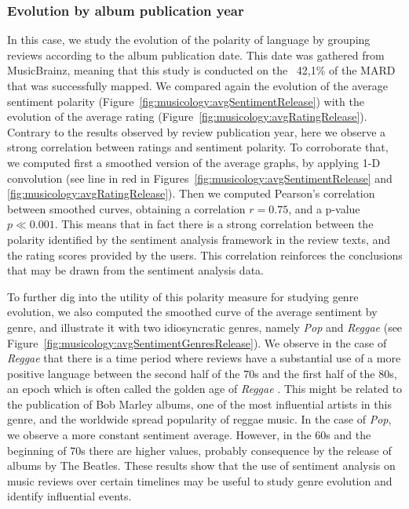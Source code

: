 \subsubsection{Evolution by album publication year}
\label{sec:musicology:evolution-album}

In this case, we study the evolution of the polarity of language by grouping reviews according to the album publication date. This date was gathered from MusicBrainz, meaning that this study is conducted on the ~42,1\% of the MARD that was successfully mapped. We compared again the evolution of the average sentiment polarity (Figure~\ref{fig:musicology:avgSentimentRelease}) with the evolution of the average rating (Figure~\ref{fig:musicology:avgRatingRelease}). Contrary to the results observed by review publication year, here we observe a strong correlation between ratings and sentiment polarity. To corroborate that, we computed first a smoothed version of the average graphs, by applying 1-D convolution (see line in red in Figures~\ref{fig:musicology:avgSentimentRelease} and \ref{fig:musicology:avgRatingRelease}). Then we computed Pearson's correlation between smoothed curves, obtaining a correlation $r = 0.75$, and a p-value $p \ll 0.001$. This means that in fact there is a strong correlation between the polarity identified by the sentiment analysis framework in the review texts, and the rating scores provided by the users. This correlation reinforces the conclusions that may be drawn from the sentiment analysis data. %

To further dig into the utility of this polarity measure for studying genre evolution, we also computed the smoothed curve of the average sentiment by genre, and illustrate it with two idiosyncratic genres, namely \textit{Pop} and \textit{Reggae} (see  Figure~\ref{fig:musicology:avgSentimentGenresRelease}). We observe in the case of \textit{Reggae} that there is a time period where reviews have a substantial use of a more positive language between the second half of the 70s and the first half of the 80s, an epoch which is often called the golden age of \textit{Reggae} \citep{alleyne2012encyclopedia}. This might be related to the publication of Bob Marley albums, one of the most influential artists in this genre, and the worldwide spread popularity of reggae music. In the case of \textit{Pop}, we observe a more constant sentiment average. However, in the 60s and the beginning of 70s there are higher values, probably consequence by the release of albums by The Beatles. These results show that the use of sentiment analysis on music reviews over certain timelines may be useful to study genre evolution and identify influential events.


